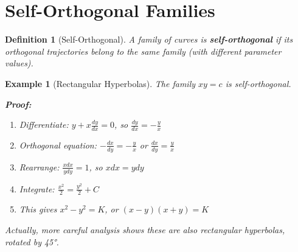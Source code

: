 \documentclass[12pt]{article}
\newtheorem{definition}{Definition}
\newtheorem{example}{Example}
\begin{document}
\begin{center}
\end{center}

\section{Self-Orthogonal Families}

\begin{definition}[Self-Orthogonal]
A family of curves is \textbf{self-orthogonal} if its orthogonal trajectories belong to the same family (with different parameter values).
\end{definition}

\begin{example}[Rectangular Hyperbolas]
The family $xy = c$ is self-orthogonal.

\textbf{Proof:}
\begin{enumerate}
    \item Differentiate: $y + x\frac{dy}{dx} = 0$, so $\frac{dy}{dx} = -\frac{y}{x}$
    \item Orthogonal equation: $-\frac{dx}{dy} = -\frac{y}{x}$ or $\frac{dx}{dy} = \frac{y}{x}$
    \item Rearrange: $\frac{x dx}{y dy} = 1$, so $x dx = y dy$
    \item Integrate: $\frac{x^{2}}{2} = \frac{y^{2}}{2} + C$
    \item This gives $x^{2} - y^{2} = K$, or $(x-y)(x+y) = K$
\end{enumerate}
Actually, more careful analysis shows these are also rectangular hyperbolas, rotated by 45°.
\end{example}
\end{document}
